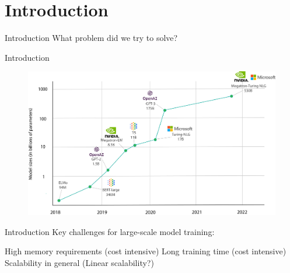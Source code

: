 \section{Introduction}

\begin{frame}{Introduction}
    What problem did we try to solve?
\end{frame}

\begin{frame}{Introduction}
    \begin{center}
        \begin{figure}[H]
            \includegraphics[scale=.4]{figures/introduction/big_language_models.png}
        \end{figure}
    \end{center}
\end{frame}

\begin{frame}{Introduction}
    Key challenges for large-scale model training:

    \begin{center}
        \begin{itemize}
            \bitem High memory requirements (cost intensive)
            \bitem Long training time  (cost intensive)
            \bitem Scalability in general (Linear scalability?)
        \end{itemize}
    \end{center}
\end{frame}


